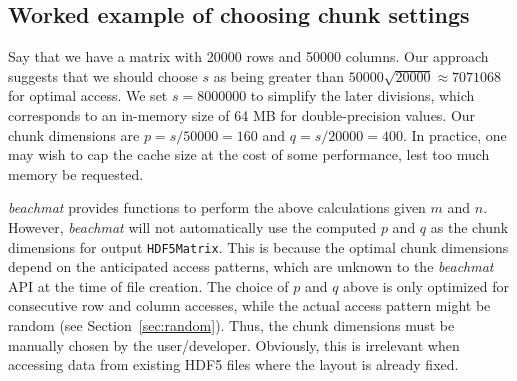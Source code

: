 \documentclass{article}
\begin{document}


%

\subsection{Worked example of choosing chunk settings}
Say that we have a matrix with 20000 rows and 50000 columns.
Our approach suggests that we should choose $s$ as being greater than $50000\sqrt{20000} \approx 7071068$ for optimal access.
We set $s=8000000$ to simplify the later divisions, which corresponds to an in-memory size of 64 MB for double-precision values.
Our chunk dimensions are $p = s/50000 = 160$ and $q = s/20000 = 400$.
In practice, one may wish to cap the cache size at the cost of some performance, lest too much memory be requested.

\textit{beachmat} provides functions to perform the above calculations given $m$ and $n$.
However, \textit{beachmat} will not automatically use the computed $p$ and $q$ as the chunk dimensions for output \texttt{HDF5Matrix}.
This is because the optimal chunk dimensions depend on the anticipated access patterns, which are unknown to the \textit{beachmat} API at the time of file creation.
The choice of $p$ and $q$ above is only optimized for consecutive row and column accesses, while the actual access pattern might be random (see Section~\ref{sec:random}).
Thus, the chunk dimensions must be manually chosen by the user/developer.
Obviously, this is irrelevant when accessing data from existing HDF5 files where the layout is already fixed.
\end{document}
